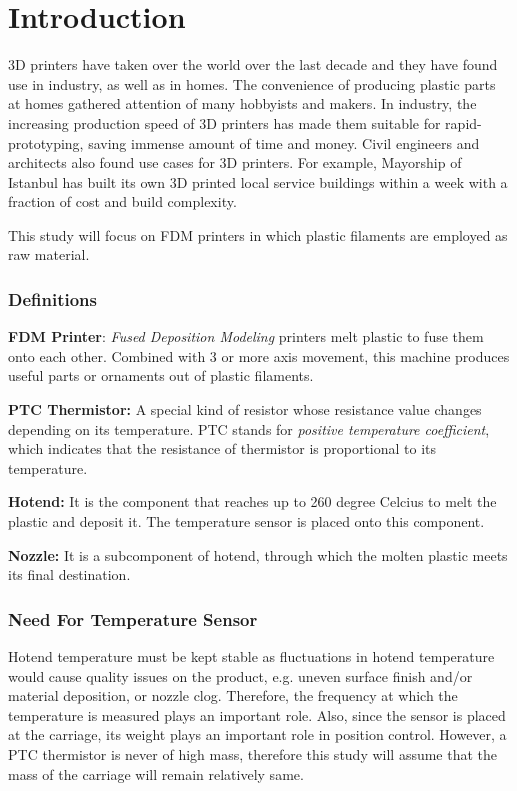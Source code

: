 \chapter*{Introduction}
\par
3D printers have taken over the world over the last decade and
they have
found use in industry, as well as in homes. The convenience of producing
plastic parts at homes gathered attention of many hobbyists and makers. In
industry, the increasing production speed of 3D printers has made
them suitable for rapid-prototyping, saving immense amount of time and
money. Civil engineers and architects also found use
cases for 3D printers. For example, Mayorship of Istanbul has built its own
3D printed
local service buildings within a week with a fraction of cost and build
complexity.

This study will focus on FDM printers in which plastic filaments are
employed as raw material.

\subsection{Definitions}

\textbf{FDM Printer}: \textit{Fused Deposition Modeling} printers melt
plastic to fuse them onto each other. Combined with 3 or more axis
movement, this machine produces useful parts or ornaments out of plastic
filaments.

\textbf{PTC Thermistor:} A special kind of resistor whose resistance value
changes depending on its temperature. PTC stands for \textit{positive
temperature coefficient}, which indicates that the resistance of thermistor
is proportional to its temperature.

\textbf{Hotend:} It is the component that reaches up to 260 degree Celcius
to melt the plastic and deposit it. The temperature sensor is placed onto
this component.

\textbf{Nozzle:} It is a subcomponent of hotend, through which the molten
plastic meets its final destination.

\subsection{Need For Temperature Sensor}

Hotend temperature must be kept stable as fluctuations in hotend
temperature would cause quality issues on the product, e.g. uneven surface
finish and/or material deposition, or nozzle clog. Therefore, the frequency
at which the temperature is measured plays an important role. Also, since
the sensor is placed at the carriage, its weight plays an important role in
position control. However, a PTC thermistor is never of high mass,
therefore this study will assume that the mass of the carriage will remain
relatively same.

